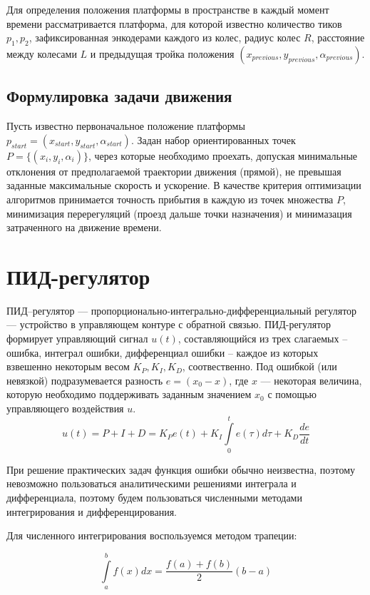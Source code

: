 \documentclass[12pt]{report}
\begin{document}
Для определения положения платформы в пространстве в каждый момент времени рассматривается платформа, для которой известно количество тиков $p_1, p_2$, зафиксированная энкодерами каждого из колес, радиус колес $R$, расстояние между колесами $L$ и предыдущая тройка положения $(x_{previous}, y_{previous}, \alpha_{previous})$.

\section{Формулировка задачи движения}
Пусть известно первоначальное положение платформы $p_{start} = (x_{start}, y_{start}, \alpha_{start})$. Задан набор ориентированных точек $P = \{(x_i, y_i, \alpha_i)\}$, через которые необходимо проехать, допуская минимальные отклонения от предполагаемой траектории движения (прямой), не превышая заданные максимальные скорость и ускорение. В качестве критерия оптимизации алгоритмов принимается точность прибытия в каждую из точек множества $P$, минимизация перерегуляций (проезд дальше точки назначения) и минимазация затраченного на движение времени.

\chapter{ПИД-регулятор}

ПИД--регулятор --- пропорционально-интегрально-дифференциальный регулятор --- устройство в управляющем контуре с обратной связью. ПИД-регулятор формирует управляющий сигнал $u(t)$, составляющийся из трех слагаемых -- ошибка, интеграл ошибки, дифференциал ошибки -- каждое из которых взвешенно некоторым весом $K_P, K_I, K_D$, соотвественно. Под ошибкой (или невязкой) подразумевается разность $e = (x_0 - x) $, где $x$ --- некоторая величина, которую необходимо поддерживать заданным значением $x_0$ с помощью управляющего воздействия $u$.
\begin{equation}\label{pid_base}
u(t) = P + I + D = K_P e(t) + K_I \int\limits_0^t e(\tau) d\tau + K_D \frac{de}{dt}
\end{equation}

При решение практических задач функция ошибки обычно неизвестна, поэтому невозможно пользоваться аналитическими решениями интеграла и дифференциала, поэтому будем пользоваться численными методами интегрирования и дифференцирования.

Для численного интегрирования воспользуемся методом трапеции:

\begin{equation}\label{trapezoid}
\int\limits_a^b f(x) dx = \frac{f(a) + f(b)}{2}(b-a)
\end{equation}
\end{document}
